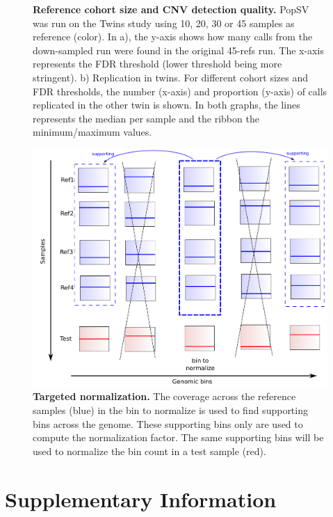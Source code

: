 \begin{figure}[htp]
\begin{subfigure}[b]{.49\textwidth}
    \caption{}
  \end{subfigure}
  \caption[Reference cohort size and CNV detection quality.]{{\bf Reference cohort size and CNV detection quality.} {\small {\sf PopSV} was run on the Twins study using 10, 20, 30 or 45 samples as reference (color). In a), the y-axis shows how many calls from the down-sampled run were found in the original 45-refs run. The x-axis represents the FDR threshold (lower threshold being more stringent). b) Replication in twins. For different cohort sizes and FDR thresholds, the number (x-axis) and proportion (y-axis) of calls replicated in the other twin is shown. In both graphs, the lines represents the median per sample and the ribbon the minimum/maximum values.}}
  \label{fig:cohortsize}
\end{figure}



\clearpage

\begin{figure}[htp]
  \centering
  \includegraphics[width=.8\textwidth]{figures/TargetNorm.pdf}
  \caption[Targeted normalization.]{{\bf Targeted normalization.} {\small The coverage across the reference samples (blue) in the bin to normalize is used to find supporting bins across the genome. These supporting bins only are used to compute the normalization factor. The same supporting bins will be used to normalize the bin count in a test sample (red).}}
  \label{fig:targetNorm}
\end{figure}

\clearpage

\section*{Supplementary Information}
\label{sec:suppmat:epipopsv}

